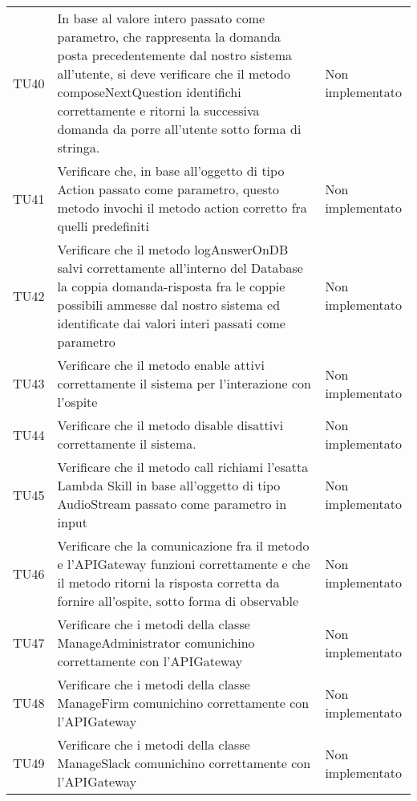 \documentclass[../PianoDiQualifica.tex]{subfiles}
\begin{document}
\begin{longtable}[c] { >{\centering\arraybackslash}p{4cm} p{7cm} >{\centering\arraybackslash}p{4cm}}
			\addlinespace[0.3em]
			\midrule
			\addlinespace[0.3em]
			TU40 & In base al valore intero passato come parametro, che rappresenta la domanda posta precedentemente dal nostro sistema all'utente, si deve verificare che il metodo composeNextQuestion identifichi correttamente e ritorni la successiva domanda da porre all'utente sotto forma di stringa. & Non implementato \\ 
			\addlinespace[0.3em]
			\midrule
			\addlinespace[0.3em]
			TU41 & Verificare che, in base all'oggetto di tipo Action passato come parametro, questo metodo invochi il metodo action corretto fra quelli predefiniti & Non implementato \\ 
			\addlinespace[0.3em]
			\midrule
			\addlinespace[0.3em]
			TU42 & Verificare che il metodo logAnswerOnDB salvi correttamente all'interno del Database la coppia domanda-risposta fra le coppie possibili ammesse dal nostro sistema ed identificate dai valori interi passati come parametro & Non implementato \\
			\addlinespace[0.3em]
			\midrule
			\addlinespace[0.3em]
			TU43 & Verificare che il metodo enable attivi correttamente il sistema per l'interazione con l'ospite & Non implementato \\
			\addlinespace[0.3em]
			\midrule
			\addlinespace[0.3em]
			TU44 & Verificare che il metodo disable disattivi correttamente il sistema. & Non implementato \\
			\addlinespace[0.3em]
			\midrule
			\addlinespace[0.3em]
			TU45 & Verificare che il metodo call richiami l'esatta Lambda Skill in base all'oggetto di tipo AudioStream passato come parametro in input & Non implementato \\
			\addlinespace[0.3em]
			\midrule
			\addlinespace[0.3em]
			TU46 & Verificare che la comunicazione fra il metodo e l'APIGateway funzioni correttamente e che il metodo ritorni la risposta corretta da fornire all'ospite, sotto forma di observable & Non implementato \\
			\addlinespace[0.3em]
			\midrule
			\addlinespace[0.3em]
			TU47 & Verificare che i metodi della classe ManageAdministrator comunichino correttamente con l'APIGateway & Non implementato \\
			\addlinespace[0.3em]
			\midrule
			\addlinespace[0.3em]
			TU48 & Verificare che i metodi della classe ManageFirm comunichino correttamente con l'APIGateway & Non implementato \\
			\addlinespace[0.3em]
			\midrule
			\addlinespace[0.3em]
			TU49 & Verificare che i metodi della classe ManageSlack comunichino correttamente con l'APIGateway & Non implementato \\

\end{longtable}
\end{document}
